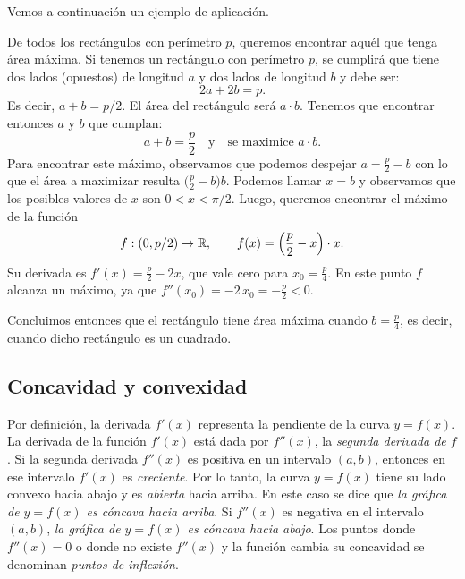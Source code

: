 Vemos a continuación un ejemplo de aplicación.
\begin{example}
    De todos los rectángulos con perímetro $p$, queremos encontrar aquél que tenga área máxima.
    Si tenemos un rectángulo con perímetro $p$, se cumplirá que tiene dos lados (opuestos) de longitud $a$ y dos lados de longitud $b$ y debe ser:
    \[ 2a+2b=p.\]
    Es decir, $a+b=p/2$. El área del rectángulo será $a\cdot b$. Tenemos que encontrar entonces $a$ 
    y $b$ que cumplan:
    \[
    a+b=\frac p2\quad\text{y}\quad \text{se maximice }a\cdot b.
    \]
    Para encontrar este máximo, observamos que podemos despejar $a=\frac p2-b$ con lo que el área a maximizar resulta $\big(\frac p2-b\big)b$. Podemos llamar $x=b$ y observamos que los posibles valores de $x$ son $0<x<\pi/2$. Luego, queremos encontrar el máximo de la función
    \[
    f:(0,p/2)\to \mathbb{R},\qquad
    f(x)=\Big(\frac p 2 - x\Big)\cdot x.
    \]
    Su derivada es $f'(x) = \frac p2-2x$, que vale cero para $x_0=\frac p4$. 
    En este punto $f$ alcanza un máximo, ya que $f''(x_0) = -2 \, x_0=-\frac p2< 0$.

    Concluimos entonces que el rectángulo tiene área máxima cuando $b=\frac p4$, es decir, cuando dicho rectángulo es un cuadrado.
\end{example}

\subsection*{Concavidad y convexidad}

Por definición, la derivada $f'(x)$ representa la pendiente de la curva $y=f(x)$. 
La derivada de la función $f'(x)$ está dada por $f''(x)$, la \emph{segunda derivada de $f$}.
Si la segunda derivada $f''(x)$ es positiva en un intervalo $(a,b)$, entonces en ese intervalo $f'(x)$ es \emph{creciente}. Por lo tanto, la curva $y=f(x)$ tiene su lado convexo hacia abajo y es \emph{abierta} hacia arriba. En este caso se dice que \emph{la gráfica de $y=f(x)$ es cóncava hacia arriba}.
Si $f''(x)$ es negativa en el intervalo $(a,b)$, \emph{la gráfica de $y=f(x)$ es cóncava hacia abajo}.
Los puntos donde $f''(x)=0$ o donde no existe $f''(x)$ y la función cambia su concavidad se denominan \emph{puntos de inflexión}.

